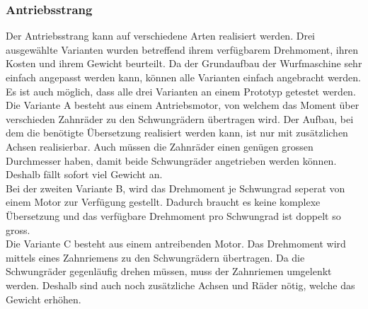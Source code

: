 \subsubsection{Antriebsstrang}

Der Antriebsstrang kann auf verschiedene Arten realisiert werden. Drei ausgewählte Varianten wurden betreffend ihrem verfügbarem Drehmoment, ihren Kosten und ihrem Gewicht beurteilt. Da der Grundaufbau der Wurfmaschine sehr einfach angepasst werden kann, können alle Varianten einfach angebracht werden. Es ist auch möglich, dass alle drei Varianten an einem Prototyp getestet werden.\\
Die Variante A besteht aus einem Antriebsmotor, von welchem das Moment über verschieden Zahnräder zu den Schwungrädern übertragen wird. Der Aufbau, bei dem die benötigte Übersetzung realisiert werden kann, ist nur mit zusätzlichen Achsen realisierbar. Auch müssen die Zahnräder einen genügen grossen Durchmesser haben, damit beide Schwungräder angetrieben werden können. Deshalb fällt sofort viel Gewicht an.\\
Bei der zweiten Variante B, wird das Drehmoment je Schwungrad seperat von einem Motor zur Verfügung gestellt. Dadurch braucht es keine komplexe Übersetzung und das verfügbare Drehmoment pro Schwungrad ist doppelt so gross.\\
Die Variante C besteht aus einem antreibenden Motor. Das Drehmoment wird mittels eines Zahnriemens zu den Schwungrädern übertragen. Da die Schwungräder gegenläufig drehen müssen, muss der Zahnriemen umgelenkt werden. Deshalb sind auch noch zusätzliche Achsen und Räder nötig, welche das Gewicht erhöhen.\\

